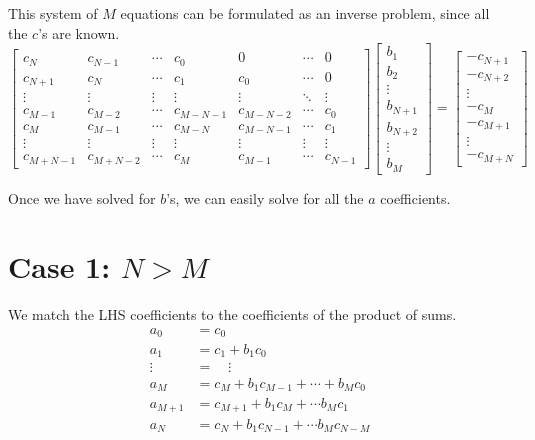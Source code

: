 \documentclass{article}
\theoremstyle{definition}
\begin{document}
This system of $M$ equations can be formulated as an inverse problem, since all the $c$'s are known. 
\[\begin{bmatrix}
c_{N} & c_{N-1} & \cdots & c_{0} & 0 & \cdots & 0\\
c_{N+1} & c_{N} & \cdots & c_{1} & c_0 & \cdots & 0\\
\vdots & \vdots & \vdots & \vdots & \vdots & \ddots & \vdots\\
c_{M-1} & c_{M-2} & \cdots & c_{M-N-1} & c_{M-N-2} & \cdots & c_0 \\
c_{M} & c_{M-1} & \cdots & c_{M-N} & c_{M-N-1} & \cdots & c_1 \\
\vdots & \vdots & \vdots & \vdots & \vdots & \vdots & \vdots\\
c_{M+N-1} & c_{M+N-2} & \cdots & c_{M} & c_{M-1} & \cdots & c_{N-1}
\end{bmatrix}\begin{bmatrix}
b_1\\
b_2\\
\vdots \\
b_{N+1}\\
b_{N+2}\\
\vdots\\
b_M
\end{bmatrix} = \begin{bmatrix}
-c_{N+1}\\
-c_{N+2}\\
\vdots \\
-c_{M}\\
-c_{M+1}\\
\vdots \\
-c_{M+N}
\end{bmatrix}\]

Once we have solved for $b$'s, we can easily solve for all the $a$ coefficients. 

\section{Case 1: $N> M$}
We match the LHS coefficients to the coefficients of the product of sums.
\begin{align*}
a_0 &= c_0\\
a_1 &= c_1 + b_1c_0\\
\vdots &= \quad\vdots\\
a_M &=c_M + b_1c_{M-1} + \cdots + b_Mc_0 \\
a_{M+1}&= c_{M+1} + b_1 c_M + \cdots b_Mc_1 \\
a_{N}&= c_N + b_1c_{N-1} + \cdots b_M c_{N-M}
\end{align*}
\end{document}
